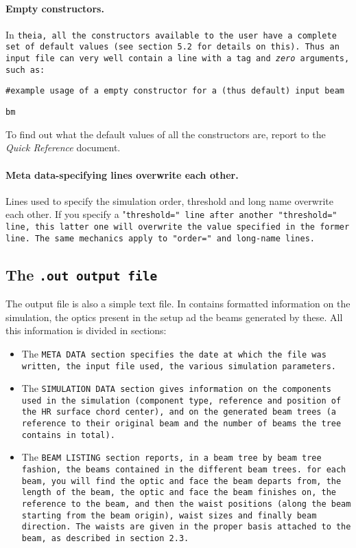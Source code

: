 \documentclass{article}
\begin{document}
\paragraph{Empty constructors.}In \tt{theia}, all the constructors available to the user have a complete set of default values (see section 5.2 for details on this). Thus an input file can very well contain a line with a tag and \textit{zero} arguments, such as: 

\tt{\#example usage of a empty constructor for a (thus default) input beam}

\tt{bm}


To find out what the default values of all the constructors are, report to the \textit{Quick Reference} document.


\paragraph{Meta data-specifying lines overwrite each other.} Lines used to specify the simulation order, threshold and long name overwrite each other. If you specify a "\tt{threshold=}" line after another "\tt{threshold=}" line, this latter one will overwrite the value specified in the former line. The same mechanics apply to "\tt{order=}" and long-name lines.

\subsection{The \tt{.out} output file}
The output file is also a simple text file. In contains formatted information on the simulation, the optics present in the setup ad the beams generated by these. All this information is divided in sections:

\begin{itemize}
\item The \tt{META DATA} section specifies the date at which the file was written, the input file used, the various simulation parameters.

\item The \tt{SIMULATION DATA} section gives information on the components used in the simulation (component type, reference and position of the HR surface chord center), and on the generated beam trees (a reference to their original beam and the number of beams the tree contains in total).

\item The \tt{BEAM LISTING} section reports, in a beam tree by beam tree fashion, the beams  contained in the different beam trees. for each beam, you will find the optic and face the beam departs from, the length of the beam, the optic and face the beam finishes on, the reference to the beam, and then the waist positions (along the beam starting from the beam origin), waist sizes and finally beam direction. The waists are given in the proper basis attached to the beam, as described in section 2.3.
\end{itemize}
\end{document}
